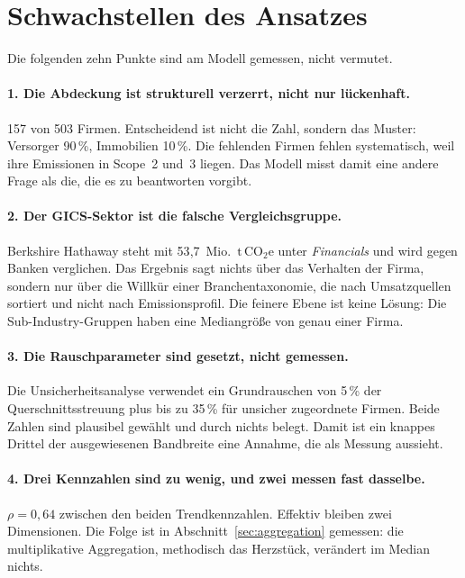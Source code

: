 \documentclass[11pt,a4paper]{article}
\newcommand{\tco}{\ensuremath{\mathrm{t\,CO}_{2}\mathrm{e}}}
\begin{document}
\section{Schwachstellen des Ansatzes}
\label{sec:schwach}

Die folgenden zehn Punkte sind am Modell gemessen, nicht vermutet.

\paragraph{1. Die Abdeckung ist strukturell verzerrt, nicht nur lückenhaft.}
157 von 503 Firmen. Entscheidend ist nicht die Zahl, sondern das Muster: Versorger 90\,\%, Immobilien 10\,\%. Die fehlenden Firmen fehlen systematisch, weil ihre Emissionen in Scope~2 und~3 liegen. Das Modell misst damit eine andere Frage als die, die es zu beantworten vorgibt.

\paragraph{2. Der GICS-Sektor ist die falsche Vergleichsgruppe.}
Berkshire Hathaway steht mit 53{,}7~Mio.~\tco{} unter \emph{Financials} und wird gegen Banken verglichen. Das Ergebnis sagt nichts über das Verhalten der Firma, sondern nur über die Willkür einer Branchentaxonomie, die nach Umsatzquellen sortiert und nicht nach Emissionsprofil. Die feinere Ebene ist keine Lösung: Die Sub-Industry-Gruppen haben eine Mediangröße von genau einer Firma.

\paragraph{3. Die Rauschparameter sind gesetzt, nicht gemessen.}
Die Unsicherheitsanalyse verwendet ein Grundrauschen von 5\,\% der Querschnittsstreuung plus bis zu 35\,\% für unsicher zugeordnete Firmen. Beide Zahlen sind plausibel gewählt und durch nichts belegt. Damit ist ein knappes Drittel der ausgewiesenen Bandbreite eine Annahme, die als Messung aussieht.

\paragraph{4. Drei Kennzahlen sind zu wenig, und zwei messen fast dasselbe.}
$\rho = 0{,}64$ zwischen den beiden Trendkennzahlen. Effektiv bleiben zwei Dimensionen. Die Folge ist in Abschnitt~\ref{sec:aggregation} gemessen: die multiplikative Aggregation, methodisch das Herzstück, verändert im Median nichts.
\end{document}
